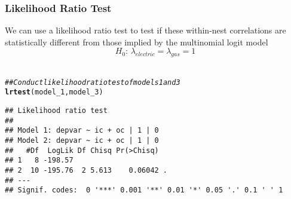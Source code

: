 \documentclass{beamer}\usepackage[]{graphicx}\usepackage[]{color}
\makeatletter
\newcommand{\hlcom}[1]{\textcolor[rgb]{0.678,0.584,0.686}{\textit{#1}}}%
\newcommand{\hlstd}[1]{\textcolor[rgb]{0.345,0.345,0.345}{#1}}%
\newcommand{\hlkwd}[1]{\textcolor[rgb]{0.737,0.353,0.396}{\textbf{#1}}}%
\newenvironment{kframe}{%
 \def\at@end@of@kframe{}%
 \ifinner\ifhmode%
  \def\at@end@of@kframe{\end{minipage}}%
  \begin{minipage}{\columnwidth}%
 \fi\fi%
 \def\FrameCommand##1{\hskip\@totalleftmargin \hskip-\fboxsep
 \colorbox{shadecolor}{##1}\hskip-\fboxsep
     \hskip-\linewidth \hskip-\@totalleftmargin \hskip\columnwidth}%
 \MakeFramed {\advance\hsize-\width
   \@totalleftmargin\z@ \linewidth\hsize
   \@setminipage}}%
 {\par\unskip\endMakeFramed%
 \at@end@of@kframe}
\newenvironment{knitrout}{}{} %
\makeatother
\begin{document}
\begin{frame}[fragile]\frametitle{Likelihood Ratio Test}
    We can use a likelihood ratio test to test if these within-nest correlations are statistically different from those implied by the multinomial logit model
    $$H_0 \text{: } \lambda_{electric} = \lambda_{gas} = 1$$ \\
\begin{knitrout}\footnotesize
{}\color{fgcolor}\begin{kframe}
\begin{alltt}
\hlcom{## Conduct likelihood ratio test of models 1 and 3}
\hlkwd{lrtest}\hlstd{(model_1, model_3)}
\end{alltt}
\begin{verbatim}
## Likelihood ratio test
## 
## Model 1: depvar ~ ic + oc | 1 | 0
## Model 2: depvar ~ ic + oc | 1 | 0
##   #Df  LogLik Df Chisq Pr(>Chisq)  
## 1   8 -198.57                      
## 2  10 -195.76  2 5.613    0.06042 .
## ---
## Signif. codes:  0 '***' 0.001 '**' 0.01 '*' 0.05 '.' 0.1 ' ' 1
\end{verbatim}
\end{kframe}
\end{knitrout}
\end{frame}
\end{document}
